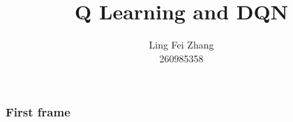 \documentclass{beamer}
\title{Q Learning and DQN}
\author{Ling Fei Zhang\\
    260985358}
\begin{document}
\maketitle

\begin{frame}
    \frametitle{First frame}

\end{frame}
\end{document}
